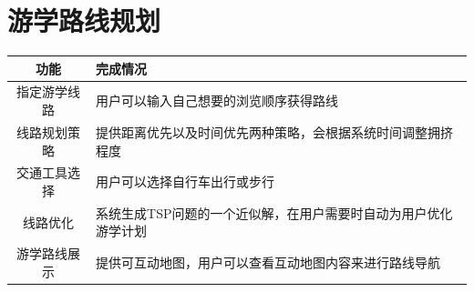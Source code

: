 \documentclass{report}
\begin{document}
\section{游学路线规划}
\begin{table}[!ht]
    \centering
    \begin{tabularx}{\textwidth}{|c|X|}
        \hline
        \textbf{功能} & \textbf{完成情况} \\ \hline
        指定游学线路 & 用户可以输入自己想要的浏览顺序获得路线 \\ \hline
        线路规划策略 & 提供距离优先以及时间优先两种策略，会根据系统时间调整拥挤程度 \\ \hline
        交通工具选择 & 用户可以选择自行车出行或步行 \\ \hline
        线路优化 & 系统生成TSP问题的一个近似解，在用户需要时自动为用户优化游学计划 \\ \hline
        游学路线展示 & 提供可互动地图，用户可以查看互动地图内容来进行路线导航 \\ \hline
    \end{tabularx}
\end{table}
\end{document}
